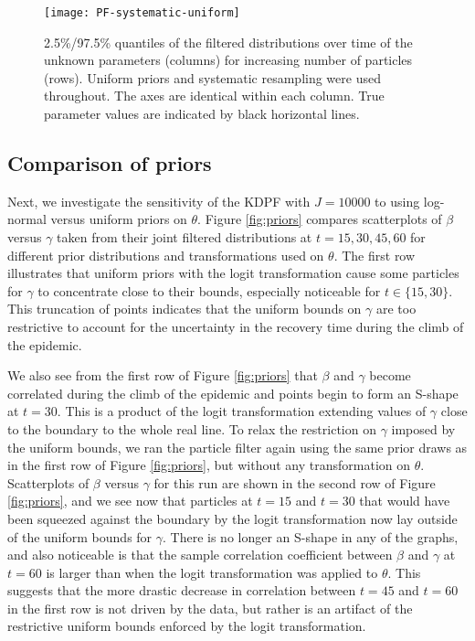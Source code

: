 \documentclass[useAMS,referee,usenatbib]{biom}
\begin{document}
\begin{figure}
\centering
\texttt{[image: PF-systematic-uniform]}
\caption{2.5\%/97.5\% quantiles of the filtered distributions over time of the unknown parameters (columns) for increasing number of particles (rows).  Uniform priors and systematic resampling were used throughout.  The axes are identical within each column.  True parameter values are indicated by black horizontal lines.} \label{fig:pfs}
\end{figure}

\subsection{Comparison of priors}

Next, we investigate the sensitivity of the KDPF with $J = 10000$ to using log-normal versus uniform priors on $\theta$.  Figure \ref{fig:priors} compares scatterplots of $\beta$ versus $\gamma$ taken from their joint filtered distributions at $t = 15, 30, 45, 60$ for different prior distributions and transformations used on $\theta$.  The first row illustrates that uniform priors with the logit transformation cause some particles for $\gamma$ to concentrate close to their bounds, especially noticeable for $t \in \{15, 30\}$.  This truncation of points indicates that the uniform bounds on $\gamma$ are too restrictive to account for the uncertainty in the recovery time during the climb of the epidemic.%

We also see from the first row of Figure \ref{fig:priors} that $\beta$ and $\gamma$ become correlated during the climb of the epidemic and points begin to form an S-shape at $t = 30$.  This is a product of the logit transformation extending values of $\gamma$ close to the boundary to the whole real line.  To relax the restriction on $\gamma$ imposed by the uniform bounds, we ran the particle filter again using the same prior draws as in the first row of Figure \ref{fig:priors}, but without any transformation on $\theta$.  Scatterplots of $\beta$ versus $\gamma$ for this run are shown in the second row of Figure \ref{fig:priors}, and we see now that particles at $t = 15$ and $t = 30$ that would have been squeezed against the boundary by the logit transformation now lay outside of the uniform bounds for $\gamma$.  There is no longer an S-shape in any of the graphs, and also noticeable is that the sample correlation coefficient between $\beta$ and $\gamma$ at $t = 60$ is larger than when the logit transformation was applied to $\theta$.  This suggests that the more drastic decrease in correlation between $t = 45$ and $t = 60$ in the first row is not driven by the data, but rather is an artifact of the restrictive uniform bounds enforced by the logit transformation.
\end{document}
